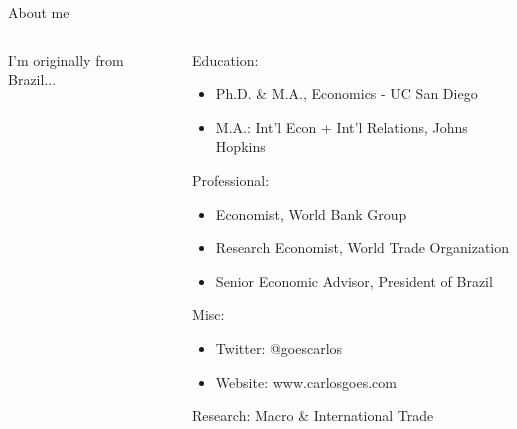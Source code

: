 \documentclass[notes,11pt, aspectratio=169, xcolor=table]{beamer}
\newenvironment{wideitemize}{\itemize\addtolength{\itemsep}{10pt}}{\enditemize}
\begin{document}
\begin{frame}{About me}

\begin{columns}[T] %
\begin{column}{.38\textwidth}
I'm originally from Brazil...
\vspace{10cm}
\end{column}%
\hfill%
\begin{column}{.58\textwidth}
  \begin{wideitemize}
    \item Education:
    \begin{itemize}
        \item Ph.D. \& M.A., Economics - UC San Diego 
        \item M.A.: Int'l Econ + Int'l Relations, Johns Hopkins 
    \end{itemize}
    \item Professional:
    \begin{itemize}
        \item Economist, World Bank Group 
        \item Research Economist, World Trade Organization
        \item Senior Economic Advisor, President of Brazil
    \end{itemize}    
    \item Misc:
    \begin{itemize}
        \item Twitter: @goescarlos
        \item Website: www.carlosgoes.com
    \end{itemize}    
    \item Research: Macro \& International Trade
  \end{wideitemize}
\end{column}%
\end{columns}
\end{frame}
\end{document}
